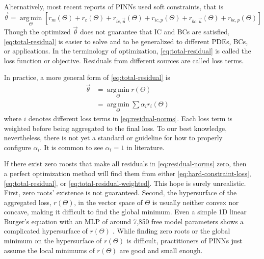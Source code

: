 Alternatively, most recent reports of PINNs used soft constraints, that is
\begin{equation}\label{eq:total-residual}
    \vec{\theta} = \operatorname*{arg\,min}\limits_{\Theta} \left[
        r_m(\Theta) + r_c(\Theta) + r_{ic,\vec{u}}(\Theta) + r_{ic,p}(\Theta) + r_{bc,\vec{u}}(\Theta) + r_{bc,p}(\Theta)
    \right]
\end{equation}
Though the optimized $\vec{\theta}$ does not guarantee that IC and BCs are satisfied, \eqref{eq:total-residual} is easier to solve and to be generalized to different PDEs, BCs, or applications.
In the terminology of optimization, \eqref{eq:total-residual} is called the loss function or objective.
Residuals from different sources are called loss terms.

In practice, a more general form of \eqref{eq:total-residual} is
\begin{equation}\label{eq:total-residual-weighted}
    \begin{aligned}
        \vec{\theta}
        &=
        \operatorname*{arg\,min}\limits_{\Theta} r(\Theta)  \\
        &=
        \operatorname*{arg\,min}\limits_{\Theta} \sum \alpha_i r_i(\Theta)
    \end{aligned}
\end{equation}
where $i$ denotes different loss terms in \eqref{eq:residual-norms}.
Each loss term is weighted before being aggregated to the final loss.
To our best knowledge, nevertheless, there is not yet a standard or guideline for how to properly configure $\alpha_i$.
It is common to see $\alpha_i=1$ in literature.

If there exist zero roosts that make all residuals in \eqref{eq:residual-norms} zero, then a perfect optimization method will find them from either \eqref{eq:hard-constraint-loss}, \eqref{eq:total-residual}, or \eqref{eq:total-residual-weighted}.
This hope is surely unrealistic.
First, zero roots' existence is not guaranteed.
Second, the hypersurface of the aggregated loss, $r(\Theta)$, in the vector space of $\Theta$ is usually neither convex nor concave, making it difficult to find the global minimum.
Even a simple 1D linear Burger's equation with an MLP of around 7,850 free model parameters shows a complicated hypersurface of $r(\Theta)$ \cite{krishnapriyan_characterizing_2021}.
While finding zero roots or the global minimum on the hypersurface of $r(\Theta)$ is difficult, practitioners of PINNs just assume the local minimums of $r(\Theta)$ are good and small enough.

